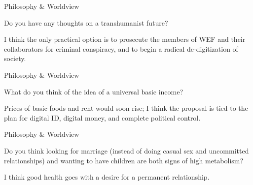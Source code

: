 \documentclass[11pt,oneside,openany,extrafontsizes]{memoir}
\begin{document}
\begin{qaexchange}{Philosophy \& Worldview}

    \begin{question}
        Do you have any thoughts on a transhumanist future?
    \end{question}

    \begin{answer}
      I think the only practical option is to prosecute the members of WEF and their collaborators for criminal conspiracy, and to begin a radical de-digitization of society.
    \end{answer}
\end{qaexchange}

\begin{qaexchange}{Philosophy \& Worldview}

    \begin{question}
        What do you think of the idea of a universal basic income?
    \end{question}

    \begin{answer}
      Prices of basic foods and rent would soon rise; I think the proposal is tied to the plan for digital ID, digital money, and complete political control.
    \end{answer}
\end{qaexchange}

\begin{qaexchange}{Philosophy \& Worldview}

    \begin{question}
        Do you think looking for marriage (instead of doing casual sex and uncommitted relationships) and wanting to have children are both signs of high metabolism?
    \end{question}

    \begin{answer}
      I think good health goes with a desire for a permanent relationship.
    \end{answer}
\end{qaexchange}
\end{document}
